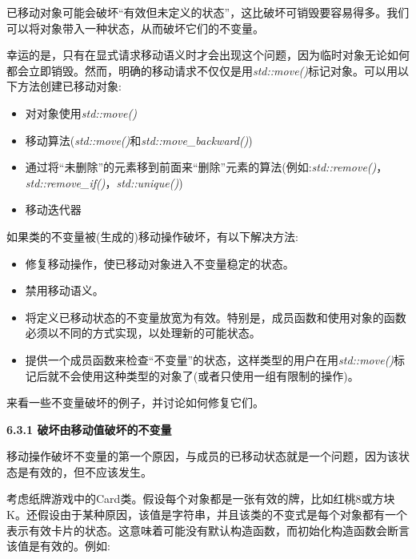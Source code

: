 已移动对象可能会破坏“有效但未定义的状态”，这比破坏可销毁要容易得多。我们可以将对象带入一种状态，从而破坏它们的不变量。\par

幸运的是，只有在显式请求移动语义时才会出现这个问题，因为临时对象无论如何都会立即销毁。然而，明确的移动请求不仅仅是用\textit{std::move()}标记对象。可以用以下方法创建已移动对象:\par

\begin{itemize}
	\item 对对象使用\textit{std::move()}
	\item 移动算法(\textit{std::move()}和\textit{std::move\_backward()})
	\item 通过将“未删除”的元素移到前面来“删除”元素的算法(例如:\textit{std::remove()}，\textit{std::remove\_if()}，\textit{std::unique()})
	\item 移动迭代器
\end{itemize}

如果类的不变量被(生成的)移动操作破坏，有以下解决方法:\par

\begin{itemize}
	\item 修复移动操作，使已移动对象进入不变量稳定的状态。
	\item 禁用移动语义。
	\item 将定义已移动状态的不变量放宽为有效。特别是，成员函数和使用对象的函数必须以不同的方式实现，以处理新的可能状态。
	\item 提供一个成员函数来检查“不变量”的状态，这样类型的用户在用\textit{std::move()}标记后就不会使用这种类型的对象了(或者只使用一组有限制的操作)。
\end{itemize}

来看一些不变量破坏的例子，并讨论如何修复它们。\par

\hspace*{\fill} \par %
\textbf{6.3.1 破坏由移动值破坏的不变量}

移动操作破坏不变量的第一个原因，与成员的已移动状态就是一个问题，因为该状态是有效的，但不应该发生。\par

考虑纸牌游戏中的Card类。假设每个对象都是一张有效的牌，比如红桃8或方块K。还假设由于某种原因，该值是字符串，并且该类的不变式是每个对象都有一个表示有效卡片的状态。这意味着可能没有默认构造函数，而初始化构造函数会断言该值是有效的。例如:\par

